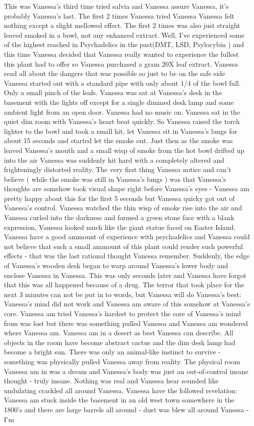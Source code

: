 \documentclass[12pt]{book}
\begin{document}
This was Vanessa's third time tried salvia and Vanessa assure Vanessa, it's probably Vanessa's last. The first 2 times Vanessa tried Vanessa Vanessa felt nothing except a slight mellowed effect. The first 2 times was also just straight leaved smoked in a bowl, not any enhanced extract. Well, I've experienced some of the highest reached in Psychadelics in the past(DMT, LSD, Psylocybin ) and this time Vanessa decided that Vanessa really wanted to experience the fullest this plant had to offer so Vanessa purchased a gram 20X leaf extract. Vanessa read all about the dangers that was possible so just to be on the safe side Vanessa started out with a standard pipe with only about 1/4 of the bowl full. Only a small pinch of the leafs. Vanessa was sat at Vanessa's desk in the basement with the lights off except for a single dimmed desk lamp and some ambient light from an open door. Vanessa had no music on. Vanessa sat in the quiet dim room with Vanessa's heart beat quickly. So Vanessa raised the torch lighter to the bowl and took a small hit, let Vanessa sit in Vanessa's lungs for about 15 seconds and started let the smoke out. Just then as the smoke was leaved Vanessa's mouth and a small wisp of smoke from the hot bowl drifted up into the air Vanessa was suddenly hit hard with a completely altered and frighteningly distorted reality. The very first thing Vanessa notice and can't believe ( while the smoke was still in Vanessa's lungs ) was that Vanessa's thoughts are somehow took visual shape right before Vanessa's eyes - Vanessa am pretty happy about this for the first 5 seconds but Vanessa quicky got out of Vanessa's control. Vanessa watched the thin wisp of smoke rise into the air and Vanessa curled into the darkness and formed a green stone face with a blank expression, Vanessa looked much like the giant statue faced on Easter Island. Vanessa have a good ammount of experience with psychadelics and Vanessa could not believe that such a small ammount of this plant could render such powerful effects - that was the last rational thought Vanessa remember. Suddenly, the edge of Vanessa's wooden desk began to warp around Vanessa's lower body and enclose Vanessa in Vanessa. This was only seconds later and Vanessa have forgot that this was all happened because of a drug. The terror that took place for the next 3 minutes can not be put in to words, but Vanessa will do Vanessa's best: Vanessa's mind did not work and Vanessa am aware of this somehow at Vanessa's core. Vanessa am tried Vanessa's hardest to protect the core of Vanessa's mind from was lost but there was something pulled Vanessa and Vanessa am wondered where Vanessa am. Vanessa am in a desert as best Vanessa can describe. All objects in the room have become abstract cactus and the dim desk lamp had become a bright sun. There was only an animal-like instinct to survive - something was physically pulled Vanessa away from reality. The physical room Vanessa am in was a dream and Vanessa's body was just an out-of-control insane thought - truly insane. Nothing was real and Vanessa hear sounded like undulating crackled all around Vanessa. Vanessa have the followed revelation: Vanessa am stuck inside the basement in an old west town somewhere in the 1800's and there are large barrels all around - dust was blew all around Vanessa - I'm 
\end{document}
